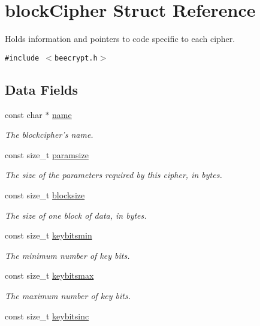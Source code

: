 \hypertarget{structblockCipher}{
\section{block\-Cipher Struct Reference}
\label{structblockCipher}
}
Holds information and pointers to code specific to each cipher.  


{\tt \#include $<$beecrypt.h$>$}

\subsection*{Data Fields}
\begin{CompactItemize}
\item 
const char $\ast$ \hyperlink{structblockCipher_o0}{name}
\begin{CompactList}\small\item\em The blockcipher's name. \item\end{CompactList}\item 
const size\_\-t \hyperlink{structblockCipher_o1}{paramsize}
\begin{CompactList}\small\item\em The size of the parameters required by this cipher, in bytes. \item\end{CompactList}\item 
const size\_\-t \hyperlink{structblockCipher_o2}{blocksize}
\begin{CompactList}\small\item\em The size of one block of data, in bytes. \item\end{CompactList}\item 
const size\_\-t \hyperlink{structblockCipher_o3}{keybitsmin}
\begin{CompactList}\small\item\em The minimum number of key bits. \item\end{CompactList}\item 
const size\_\-t \hyperlink{structblockCipher_o4}{keybitsmax}
\begin{CompactList}\small\item\em The maximum number of key bits. \item\end{CompactList}\item 
const size\_\-t \hyperlink{structblockCipher_o5}{keybitsinc}

\end{CompactItemize}
